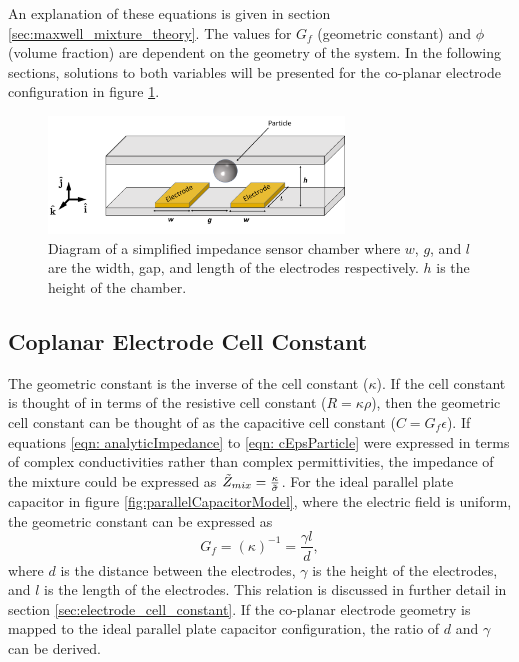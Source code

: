 \par An explanation of these equations is given in section \ref{sec:maxwell_mixture_theory}. The values for $G_f$ (geometric constant) and $\phi$ (volume fraction) are dependent on the geometry of the system. In the following sections, solutions to both variables will be presented for the co-planar electrode configuration in figure \ref{fig:simplified_IS_models}.


 \begin{figure}[ht]
 \centering
 \includegraphics[width=0.7\textwidth]{images/singleCellSuspensionModelWithCoordinateSystem.png}
 \caption[Diagram of the simplified impedance sensor chamber.]{Diagram of a simplified impedance sensor chamber where $w$, $g$, and $l$ are the width, gap, and length of the electrodes respectively. $h$ is the height of the chamber.}
 \label{fig:simplified_IS_models}
 \end{figure}


\subsection{Coplanar Electrode Cell Constant}
\label{sec: coplanarElectrodeCellConstant}
    \par The geometric constant is the inverse of the cell constant ($\kappa$). If the cell constant is thought of in terms of the resistive cell constant ($R=\kappa\rho$), then the geometric cell constant can be thought of as the capacitive cell constant ($C=G_f\epsilon$). If equations \ref{eqn: analyticImpedance} to \ref{eqn: cEpsParticle} were expressed in terms of complex conductivities rather than complex permittivities, the impedance of the mixture could be expressed as $\Tilde{Z}_{mix}=\frac{\kappa}{\Tilde{\sigma}}$. For the ideal parallel plate capacitor in figure \ref{fig:parallelCapacitorModel}, where the electric field is uniform, the geometric constant can be expressed as
    \begin{equation}
        G_f = (\kappa)^{-1} = \frac{\gamma l}{d},
        \label{eqn: cellConstants}
    \end{equation}
    \noindent where $d$ is the distance between the electrodes, $\gamma$ is the height of the electrodes, and $l$ is the length of the electrodes. This relation is discussed in further detail in section \ref{sec:electrode_cell_constant}. If the co-planar electrode geometry is mapped to the ideal parallel plate capacitor configuration, the ratio of $d$ and $\gamma$ can be derived. 


